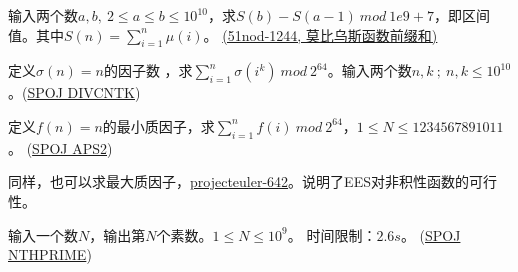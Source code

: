 





\vbox{}





\begin{example}
	输入两个数$a,b,\ 2\le a\le b\le 10^{10}$，求$S(b)-S(a-1)\ mod\ 1e9+7$，即区间值。其中$S(n)=\sum_{i=1}^{n}\mu(i)$。
	\href{https://www.51nod.com/Challenge/Problem.html#problemId=1244}{(51nod-1244, 莫比乌斯函数前缀和)}
\end{example}
 







\vbox{}





\begin{example}
	定义$\sigma(n)=n$的因子数  ，求$\sum_{i=1}^n\sigma(i^k)  \ mod  \ 2^{64}$。输入两个数$n,k\ ;\ n,k \le 10^{10}$。(\href{https://www.spoj.com/problems/DIVCNTK/}{SPOJ DIVCNTK})      
\end{example}
  







\vbox{}




\begin{example}
定义$f(n)=n$的最小质因子，求$\sum_{i=1}^nf(i)   \ mod \ 2^{64}$，$1\le N\le 1234567891011$。   
(\href{https://www.spoj.com/problems/APS2/}{SPOJ APS2})
\end{example}



\begin{note}
	同样，也可以求最大质因子，\href{https://projecteuler.net/problem=642}{projecteuler-642}。说明了EES对非积性函数的可行性。
\end{note} 
 
 
 
 
\vbox{}




\begin{example}
输入一个数$N$，输出第$N$个素数。$1\le N\le 10^9$。 时间限制：$2.6s$。
(\href{https://www.spoj.com/problems/NTHPRIME/en/}{SPOJ NTHPRIME})
\end{example}

